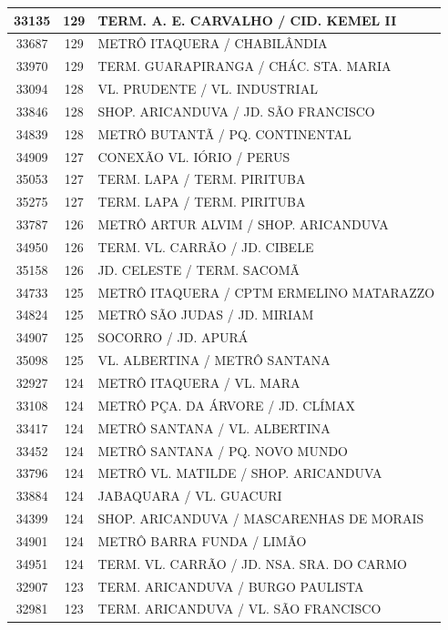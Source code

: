 \documentclass[
	12pt,				%
	oneside,			%
	a4paper,			%
	english,			%
	brazil				%
	]{abntex2ppgsi}
\begin{document}
{{\begin{apendicesenv}
\begin{longtable}{c|c|p{7cm}}
 \hline 
33135 &	129 &	TERM. A. E. CARVALHO / CID. KEMEL II \\ 
 \hline 
33687 &	129 &	METRÔ ITAQUERA / CHABILÂNDIA \\ 
 \hline 
33970 &	129 &	TERM. GUARAPIRANGA / CHÁC. STA. MARIA \\ 
 \hline 
33094 &	128 &	VL. PRUDENTE / VL. INDUSTRIAL \\ 
 \hline 
33846 &	128 &	SHOP. ARICANDUVA / JD. SÃO FRANCISCO \\ 
 \hline 
34839 &	128 &	METRÔ BUTANTÃ / PQ. CONTINENTAL \\ 
 \hline 
34909 &	127 &	CONEXÃO VL. IÓRIO / PERUS \\ 
 \hline 
35053 &	127 &	TERM. LAPA / TERM. PIRITUBA \\ 
 \hline 
35275 &	127 &	TERM. LAPA / TERM. PIRITUBA \\ 
 \hline 
33787 &	126 &	METRÔ ARTUR ALVIM / SHOP. ARICANDUVA \\ 
 \hline 
34950 &	126 &	TERM. VL. CARRÃO / JD. CIBELE \\ 
 \hline 
35158 &	126 &	JD. CELESTE / TERM. SACOMÃ \\ 
 \hline 
34733 &	125 &	METRÔ ITAQUERA / CPTM ERMELINO MATARAZZO \\ 
 \hline 
34824 &	125 &	METRÔ SÃO JUDAS / JD. MIRIAM \\ 
 \hline 
34907 &	125 &	SOCORRO / JD. APURÁ \\ 
 \hline 
35098 &	125 &	VL. ALBERTINA / METRÔ SANTANA \\ 
 \hline 
32927 &	124 &	METRÔ ITAQUERA / VL. MARA \\ 
 \hline 
33108 &	124 &	METRÔ PÇA. DA ÁRVORE / JD. CLÍMAX \\ 
 \hline 
33417 &	124 &	METRÔ SANTANA / VL. ALBERTINA \\ 
 \hline 
33452 &	124 &	METRÔ SANTANA / PQ. NOVO MUNDO \\ 
 \hline 
33796 &	124 &	METRÔ VL. MATILDE / SHOP. ARICANDUVA \\ 
 \hline 
33884 &	124 &	JABAQUARA / VL. GUACURI \\ 
 \hline 
34399 &	124 &	SHOP. ARICANDUVA / MASCARENHAS DE MORAIS \\ 
 \hline 
34901 &	124 &	METRÔ BARRA FUNDA / LIMÃO \\ 
 \hline 
34951 &	124 &	TERM. VL. CARRÃO / JD. NSA. SRA. DO CARMO \\ 
 \hline 
32907 &	123 &	TERM. ARICANDUVA / BURGO PAULISTA \\ 
 \hline 
32981 &	123 &	TERM. ARICANDUVA / VL. SÃO FRANCISCO \\ 

\end{longtable}
\end{apendicesenv}}}
\end{document}
